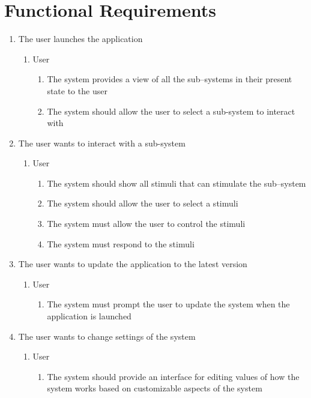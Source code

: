 \documentclass[]{article}
\begin{document}
\section{Functional Requirements}
\label{sec:functional_requirements}

\begin{enumerate}
	\item The user launches the application
	\begin{enumerate}
		\item User
			\begin{enumerate}
				\item The system provides a view of all the sub--systems in their present state to the user
				\item The system should allow the user to select a sub-system to interact with
			\end{enumerate}
	\end{enumerate}
	\item The user wants to interact with a sub-system
	\begin{enumerate}
		\item User
			\begin{enumerate}
				\item The system should show all stimuli that can stimulate the sub--system
				\item The system should allow the user to select a stimuli
				\item The system must allow the user to control the stimuli
				\item The system must respond to the stimuli
			\end{enumerate}
	\end{enumerate}
	\item The user wants to update the application to the latest version
	\begin{enumerate}
		\item User
			\begin{enumerate}
				\item The system must prompt the user to update the system when the application is launched
			\end{enumerate}
	\end{enumerate}
	\item The user wants to change settings of the system
	\begin{enumerate}
		\item User
			\begin{enumerate}
				\item The system should provide an interface for editing values of how the system works based on customizable aspects of the system

\end{enumerate}
\end{enumerate}
\end{enumerate}
\end{document}
